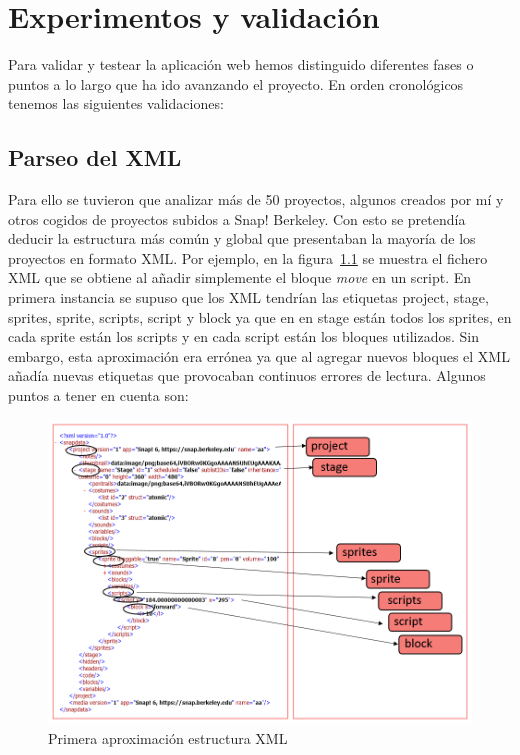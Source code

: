 \documentclass[a4paper, 12pt]{book}
\begin{document}
\cleardoublepage
\chapter{Experimentos y validación}


Para validar y testear la aplicación web hemos distinguido diferentes fases o puntos a lo largo que ha ido avanzando el proyecto. En orden cronológicos tenemos las siguientes validaciones:
\section{Parseo del XML}
Para ello se tuvieron que analizar más de 50 proyectos, algunos creados por mí y otros cogidos de proyectos subidos a Snap! Berkeley. Con esto se pretendía deducir la estructura más común y global que presentaban la mayoría de los proyectos en formato XML. Por ejemplo, en la figura~\ref{figura:xml-1} se muestra el fichero XML que se obtiene al añadir simplemente el bloque \textit{move} en un script. En primera instancia se supuso que los XML tendrían las etiquetas project, stage, sprites, sprite, scripts, script y block ya que en en stage están todos los sprites, en cada sprite están los scripts y en cada script están los bloques utilizados. Sin embargo, esta aproximación era errónea ya que al agregar nuevos bloques el XML añadía nuevas etiquetas que provocaban continuos errores de lectura. Algunos puntos a tener en cuenta son:
\begin{figure}[h]
            \centering
            \includegraphics[scale=0.6]{img/xml_val.PNG}
            \caption{Primera aproximación estructura XML}
            \label{figura:xml-1}
        \end{figure}
        
\end{document}
